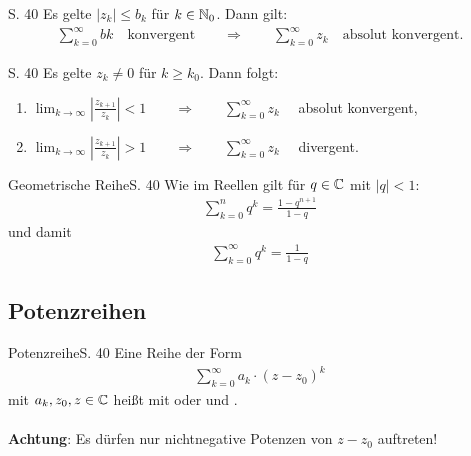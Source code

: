 \begin{satz}[Majorantenkriterium]{S. 40}
  Es gelte $|z_k| \leq b_k$ für $k \in \mathbb{N}_0$. Dann gilt:
  \begin{align}
    \sum_{k=0}^\infty bk \quad \text{konvergent} \qquad \Rightarrow \qquad \sum_{k=0}^\infty z_k \quad \text{absolut konvergent.}
  \end{align}
\end{satz}

\begin{satz}[Quotientenkriterium]{S. 40}
  Es gelte $z_k \neq 0$ für $k \geq k_0$. Dann folgt:
  \begin{enumerate}[label=\alph*)]
    \item $\displaystyle \lim_{k \to \infty} \left| \frac{z_{k+1}}{z_k} \right| < 1 \qquad \Rightarrow \qquad \sum_{k=0}^\infty z_k \quad$ absolut konvergent,
    \item $\displaystyle \lim_{k \to \infty} \left| \frac{z_{k+1}}{z_k} \right| > 1 \qquad \Rightarrow \qquad \sum_{k=0}^\infty z_k \quad$ divergent.
  \end{enumerate}
\end{satz}

\begin{bemerkung}{Geometrische Reihe}{S. 40}
  Wie im Reellen gilt für $q \in \mathbb{C}$ mit $|q| < 1$:
  \begin{align}
    \sum_{k=0}^n q^k = \frac{1 - q^{n+1}}{1-q}
  \end{align}
  und damit
  \begin{align}
    \sum_{k=0}^\infty q^k = \frac{1}{1-q}
  \end{align}
\end{bemerkung}



\subsection{Potenzreihen}

\begin{bemerkung}{Potenzreihe}{S. 40}
  Eine Reihe der Form
  \begin{align}
    \sum_{k=0}^\infty a_k \cdot (z-z_0)^k \label{eq:potenzreihe}
  \end{align}
  mit $a_k, z_0, z \in \mathbb{C}$ heißt  mit  oder  und .\\
  \ \\
  \textbf{Achtung}: Es dürfen nur nichtnegative Potenzen von $z - z_0$ auftreten!
\end{bemerkung}

